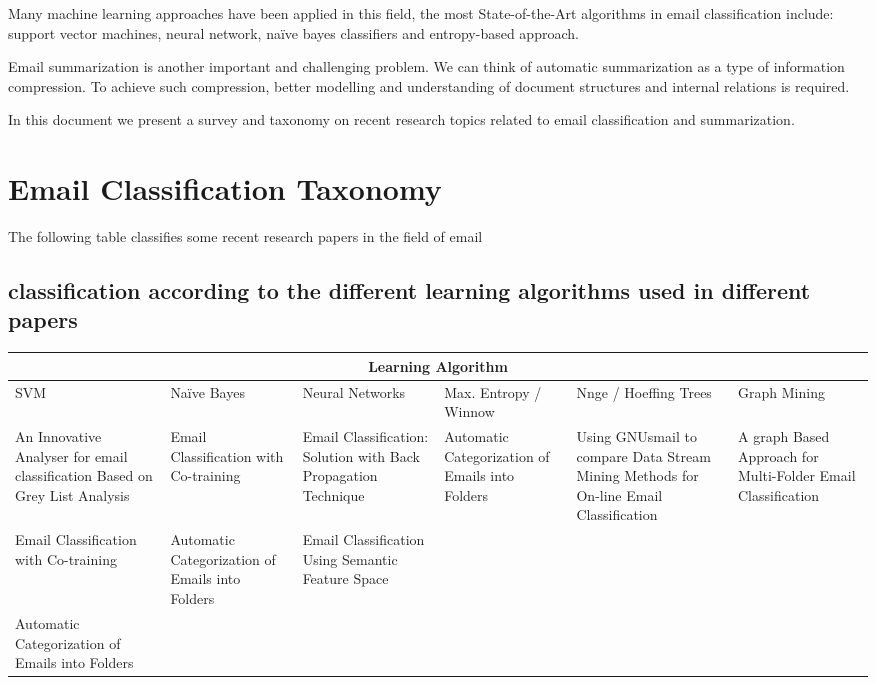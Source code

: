 \documentclass[12pt]{article}
\begin{document}
Many machine learning approaches have been applied in this field, the most 
State-of-the-Art algorithms in email classification include: support vector 
machines, neural network, naïve bayes classifiers and entropy-based approach. 

Email summarization is another important and challenging problem. We can think 
of automatic summarization as a type of information compression. To achieve such 
compression, better modelling and understanding of document structures and internal 
relations is required. 

In this document we present a survey and taxonomy on recent research topics 
related to email classification and summarization.

\section{Email Classification Taxonomy}
The following table classifies some recent research papers in the field of email 

\subsection{classification according to the different learning algorithms used in different papers}

\begin{center}
\begin{tabular}{|p{2cm}|p{2cm}|p{2cm}|p{2cm}|p{2cm}|p{2cm}|}
\hline
\multicolumn{6}{|c|}{Learning Algorithm} \\
\hline
SVM & Naïve Bayes & Neural Networks & Max. Entropy / Winnow & Nnge / Hoeffing Trees & Graph Mining \\ \hline
An Innovative Analyser for email classification Based on Grey List Analysis &
Email Classification with Co-training &
Email Classification: Solution with Back Propagation Technique & 
Automatic Categorization of Emails into Folders &
Using GNUsmail to compare Data Stream Mining Methods for On-line Email Classification &
A graph Based Approach for Multi-Folder Email Classification \\ \hline

Email Classification with Co-training &
Automatic Categorization of Emails into Folders &
Email Classification Using Semantic Feature Space & 
&
&
 \\ \hline

Automatic Categorization of Emails into Folders &
&
& 
&
&

 \\
\hline
\end{tabular}
\end{center}
 
\end{document}
